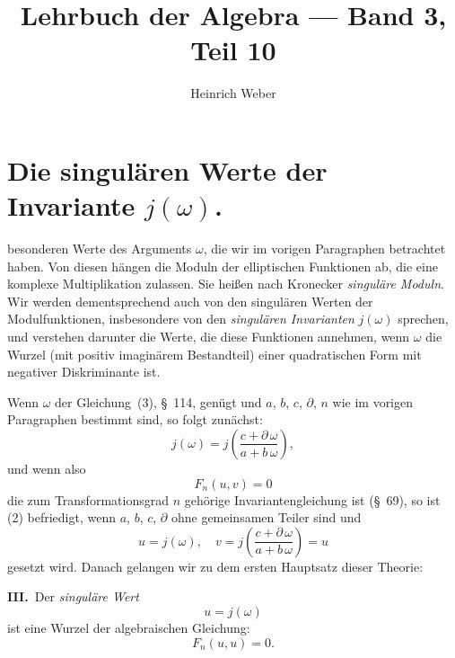 \documentclass[12pt,a4paper]{article}
\title{Lehrbuch der Algebra --- Band 3, Teil 10}
\author{Heinrich Weber}
\date{}
\theoremstyle{weber}
\begin{document}
\maketitle
\thispagestyle{empty}

\setcounter{section}{114}

\section{Die singulären Werte der Invariante $j(\omega)$.}


besonderen Werte des Arguments $\omega$, die wir im vorigen Paragraphen betrachtet haben. Von diesen hängen die Moduln der elliptischen Funktionen ab, die eine komplexe Multiplikation zulassen. Sie heißen nach Kronecker \textit{singuläre Moduln}. Wir werden dementsprechend auch von den singulären Werten der Modulfunktionen, insbesondere von den \textit{singulären Invarianten} $j(\omega)$ sprechen, und verstehen darunter die Werte, die diese Funktionen annehmen, wenn $\omega$ die Wurzel (mit positiv imaginärem Bestandteil) einer quadratischen Form mit negativer Diskriminante ist.

Wenn $\omega$ der Gleichung~(3), \S~114, genügt und $a$, $b$, $c$, $\partial$, $n$ wie im vorigen Paragraphen bestimmt sind, so folgt zunächst:
\begin{equation}
j(\omega) = j\left(\frac{c + \partial\,\omega}{a + b\,\omega}\right),
\end{equation}
und wenn also
\begin{equation}
F_n(u, v) = 0
\end{equation}
die zum Transformationsgrad $n$ gehörige Invariantengleichung ist (\S~69), so ist (2) befriedigt, wenn $a$, $b$, $c$, $\partial$ ohne gemeinsamen Teiler sind und
\begin{equation}
u = j(\omega), \quad v = j\left(\frac{c + \partial\,\omega}{a + b\,\omega}\right) = u
\end{equation}
gesetzt wird. Danach gelangen wir zu dem ersten Hauptsatz dieser Theorie:

\medskip
\textbf{III.}\ Der \textit{singuläre Wert}
\[
u = j(\omega)
\]
ist eine Wurzel der algebraischen Gleichung:
\begin{equation}
F_n(u, u) = 0.
\end{equation}
\end{document}
